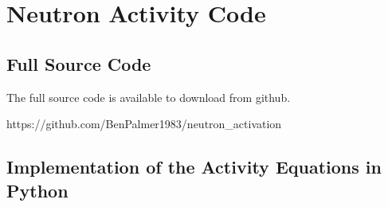 \chapter{Neutron Activity Code}

\section{Full Source Code}

The full source code is available to download from github.

https://github.com/BenPalmer1983/neutron\_activation


\section{Implementation of the Activity Equations in Python}


